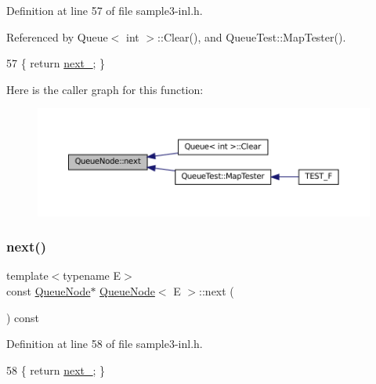 Definition at line 57 of file sample3-\/inl.\+h.



Referenced by Queue$<$ int $>$\+::\+Clear(), and Queue\+Test\+::\+Map\+Tester().


\begin{DoxyCode}
57 \{ \textcolor{keywordflow}{return} \hyperlink{classQueueNode_a7434603f6c25418f7810f041752876bd}{next\_}; \}
\end{DoxyCode}
Here is the caller graph for this function\+:
\nopagebreak
\begin{figure}[H]
\begin{center}
\leavevmode
\includegraphics[width=350pt]{classQueueNode_a8a9fdf488da06533360999ef85db56ea_icgraph}
\end{center}
\end{figure}
\mbox{\label{classQueueNode_ada477e4f309f29383112dbda473dd985}} 
\subsubsection{\texorpdfstring{next()}{next()}\hspace{0.1cm}{\footnotesize\ttfamily [2/2]}}
{\footnotesize\ttfamily template$<$typename E$>$ \\
const \hyperlink{classQueueNode}{Queue\+Node}$\ast$ \hyperlink{classQueueNode}{Queue\+Node}$<$ E $>$\+::next (\begin{DoxyParamCaption}{ }\end{DoxyParamCaption}) const\hspace{0.3cm}{\ttfamily [inline]}}



Definition at line 58 of file sample3-\/inl.\+h.


\begin{DoxyCode}
58 \{ \textcolor{keywordflow}{return} \hyperlink{classQueueNode_a7434603f6c25418f7810f041752876bd}{next\_}; \}
\end{DoxyCode}
\mbox{\label{classQueueNode_a8635bbe6310e011ef4fcf1a01566dbb7}} 
